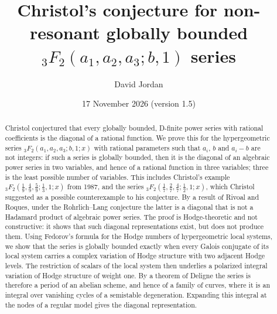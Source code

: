 \documentclass[11pt]{amsart}
\theoremstyle{definition}
\theoremstyle{remark}
\numberwithin{equation}{section}
\begin{document}
\title[Christol's conjecture for non-resonant ${}_3F_2(a;b,1)$]{Christol's conjecture for non-resonant globally bounded ${}_3F_2(a_1,a_2,a_3;b,1)$ series}

\author{David Jordan}
\address{Maynooth University Social Sciences Institute (MUSSI), Maynooth University, Maynooth, County Kildare, Ireland}

\date{17 November 2026 (version 1.5)}

\begin{abstract}
Christol conjectured that every globally bounded, D-finite power series with rational coefficients is the diagonal of a rational function. We prove this for the hypergeometric series ${}_3F_2(a_1,a_2,a_3;b,1;x)$ with rational parameters such that $a_i$, $b$ and $a_i-b$ are not integers: if such a series is globally bounded, then it is the diagonal of an algebraic power series in two variables, and hence of a rational function in three variables; three is the least possible number of variables. This includes Christol's example ${}_3F_2(\frac19,\frac49,\frac59;\frac13,1;x)$ from 1987, and the series ${}_3F_2(\frac17,\frac27,\frac47;\frac12,1;x)$, which Christol suggested as a possible counterexample to his conjecture. By a result of Rivoal and Roques, under the Rohrlich--Lang conjecture the latter is a diagonal that is not a Hadamard product of algebraic power series. The proof is Hodge-theoretic and not constructive: it shows that such diagonal representations exist, but does not produce them. Using Fedorov's formula for the Hodge numbers of hypergeometric local systems, we show that the series is globally bounded exactly when every Galois conjugate of its local system carries a complex variation of Hodge structure with two adjacent Hodge levels. The restriction of scalars of the local system then underlies a polarized integral variation of Hodge structure of weight one. By a theorem of Deligne the series is therefore a period of an abelian scheme, and hence of a family of curves, where it is an integral over vanishing cycles of a semistable degeneration. Expanding this integral at the nodes of a regular model gives the diagonal representation.
\end{abstract}

\maketitle
\end{document}
